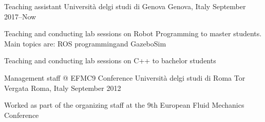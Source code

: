 \begin{cventries}
  \cventry
    {Teaching assistant} %
    {Università delgi studi di Genova} %
    {Genova, Italy} %
    {September 2017–Now} %
    {
      \begin{cvitems} %
        \item {Teaching and conducting lab sessions on Robot Programming to master students. Main topics are: ROS programmingand GazeboSim}
        \item {Teaching and conducting lab sessions on C++ to bachelor students}
      \end{cvitems}
    }
  \cventry
    {Management staff @ EFMC9 Conference} %
    {Università delgi studi di Roma Tor Vergata} %
    {Roma, Italy} %
    {September 2012} %
    {
      \begin{cvitems} %
        \item {Worked as part of the organizing staff at the 9th European Fluid Mechanics Conference}
      \end{cvitems}
    }

\end{cventries}
